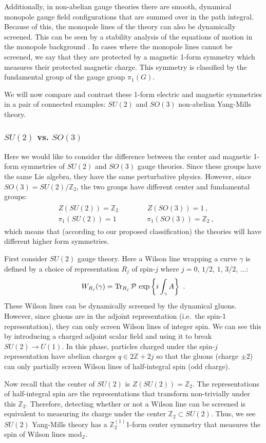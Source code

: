\documentclass[11pt]{article}
\newcommand{\eq}[1]{\begin{align}\begin{split}#1\end{split}\end{align}}
\def\Tr{{\rm Tr}}
\def\CP {{\cal P}}
\def\IZ{{\mathbb{Z}}}
\begin{document}
Additionally, in non-abelian gauge theories there are smooth, dynamical monopole gauge field configurations that are summed over in the path integral. Because of this, the monopole lines of the theory can also be dynamically screened. This can be seen by a stability analysis of the equations of motion in the monopole background  \cite{Coleman:1982cx}.  
In cases where the monopole lines cannot be screened, we say that they are protected by a magnetic 1-form symmetry which measures their protected magnetic charge. This symmetry is classified by the fundamental group of the gauge group $ \pi_1(G)$. 


We will now compare and contrast these 1-form electric and magnetic symmetries  in a pair of connected  examples: $SU(2)$ and  $SO(3)$ non-abelian Yang-Mills theory. 

\subsubsection{$SU(2)$ vs. $SO(3)$}
\label{subsubsec:SU2_vs_SO3}

Here we would like to consider the difference between the center and magnetic 1-form symmetries of $SU(2)$ and $SO(3)$ gauge theories. Since these groups have the same Lie algebra, they have the same perturbative physics. However, since $SO(3)=SU(2)/\IZ_2$, the two groups have different   center and fundamental groups:
\eq{ 
&Z(SU(2))=\IZ_2\qquad \qquad Z(SO(3))=1~,\\
&\pi_1(SU(2))=1~\qquad \qquad \pi_1(SO(3))=\IZ_2~,
}
which means that (according to our proposed classification) the theories will have different higher form symmetries. 


First consider $SU(2)$ gauge theory. Here a Wilson line wrapping a curve $\gamma$ is defined by a choice of representation $R_j$ of spin-$j$ where $j=0,\,1/2,\,1,\,3/2,\,...$:
\eq{
W_{R_j}(\gamma)=\Tr_{R_j}\,\CP~{\rm exp}\left\{i \int_\gamma A\right\}~.
}
These Wilson lines can be dynamically screened by the dynamical gluons. However, since gluons are in the adjoint representation (i.e.~the spin-1 representation),
they can only screen Wilson lines of integer spin. We can see this by introducing a charged adjoint scalar field and using it to break $SU(2)\to U(1)$. In this phase, particles charged under the spin-$j$ representation have  abelian charges $q\in 2\IZ+2j$ so that the gluons (charge $\pm2$) can only partially screen Wilson lines of half-integral spin (odd charge). 

Now recall that the center of $SU(2)$ is $Z(SU(2))=\IZ_2$. 
The representations of half-integral spin  are the representations that transform non-trivially under this $\IZ_2$. Therefore, detecting whether or not a Wilson line can be screened is equivalent to measuring its charge under the center $\IZ_2\subset SU(2)$. 
Thus, we see $SU(2)$ Yang-Mills theory has a $\IZ_2^{(1)}$1-form  center symmetry that measures the spin of Wilson lines mod$_\IZ$.  
\end{document}
